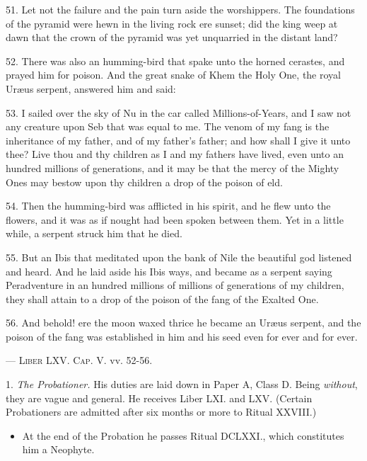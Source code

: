 {
\raggedbottom
{}


\begin{quoting}
\small
51. Let not the failure and the pain turn aside the worshippers. The
foundations of the pyramid were hewn in the living rock ere sunset; did the
king weep at dawn that the crown of the pyramid was yet unquarried in the
distant land?

52. There was also an humming-bird that spake unto the horned cerastes,
and prayed him for poison. And the great snake of Khem the Holy One, the
royal Ur\ae{}us serpent, answered him and said:

53. I sailed over the sky of Nu in the car called Millions-of-Years, and I saw
not any creature upon Seb that was equal to me. The venom of my fang is
the inheritance of my father, and of my father’s father; and how shall I give
it unto thee? Live thou and thy children as I and my fathers have lived, even
unto an hundred millions of generations, and it may be that the mercy of the
Mighty Ones may bestow upon thy children a drop of the poison of eld.

54. Then the humming-bird was afflicted in his spirit, and he flew unto the flowers, and it was as if nought had been spoken between them. Yet in a little while, a serpent struck him that he died.

55. But an Ibis that meditated upon the bank of Nile the beautiful god
listened and heard. And he laid aside his Ibis ways, and became as a serpent
saying Peradventure in an hundred millions of millions of generations of my
children, they shall attain to a drop of the poison of the fang of the Exalted
One.

56. And behold! ere the moon waxed thrice he became an Ur\ae{}us serpent, and the poison of the fang was established in him and his seed even for ever and for ever.

--- \textsc{Liber LXV. Cap. V.} vv. 52-56.
\end{quoting}
}

\pagebreak

1. \textit{The Probationer.} His duties are laid down in Paper A, Class D. Being \textit{without}, they are vague and general. He receives Liber LXI. and LXV. (Certain Probationers are admitted after six months or more to Ritual XXVIII.)
\begin{itemize}
\item At the end of the Probation he passes Ritual DCLXXI., which constitutes him a Neophyte.
\end{itemize}

